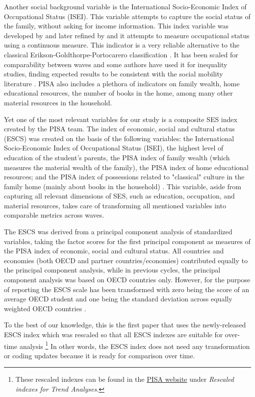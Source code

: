 \documentclass[11pt, a4paper]{article}\usepackage[]{graphicx}\usepackage[]{color}
\begin{document}
Another social background variable is the International Socio-Economic Index of Occupational Status (ISEI). This variable attempts to capture the social status of the family, without asking for income information. This index variable was developed by \citet{ganzeboom1996} and later refined by \citep{ganzeboom2010} and it attempts to measure occupational status using a continuous measure. This indicator is a very reliable alternative to the  classical Erikson-Goldthorpe-Portocarero classification \citep{erikson1979}. It has been scaled for comparability between waves and some authors have used it for inequality studies, finding expected results to be consistent with the social mobility literature \citep{anna2016_global}. PISA also includes a plethora of indicators on family wealth, home educational resources, the number of books in the home, among many other material resources in the household.

Yet one of the most relevant variables for our study is a composite SES index created by the PISA team. The index of economic, social and cultural status (ESCS) was created on the basis of the following variables: the International Socio-Economic Index of Occupational Status (ISEI), the highest level of education of the student’s parents, the PISA index of family wealth (which measures the material wealth of the family), the PISA index of home educational resources; and the PISA index of possessions related to "classical" culture in the family home (mainly about books in the household) \citep{oecd_glance_2002}. This variable, aside from capturing all relevant dimensions of SES, such as education, occupation, and material resources, takes care of transforming all mentioned variables into comparable metrics across waves. 

The ESCS was derived from a principal component analysis of standardized variables, taking the factor scores for the first principal component as measures of the PISA index of economic, social and cultural status. All countries and economies (both OECD and partner countries/economies) contributed equally to the principal component analysis, while in previous cycles, the principal component analysis was based on OECD countries only. However, for the purpose of reporting the ESCS scale has been transformed with zero being the score of an average OECD student and one being the standard deviation across equally weighted OECD countries \citep{pisa_2015_results}.

To the best of our knowledge, this is the first paper that uses the newly-released ESCS index \citep{pisa_2015_results} which was rescaled so that all ESCS indexes are suitable for over-time analysis \footnote{These rescaled indexes can be found in the \href{http://www.oecd.org/pisa/data/2015database/}{PISA website} under \emph{Rescaled indexes for Trend Analyses}.} In other words, the ESCS index does not need any transformation or coding updates because it is ready for comparison over time.
\end{document}
